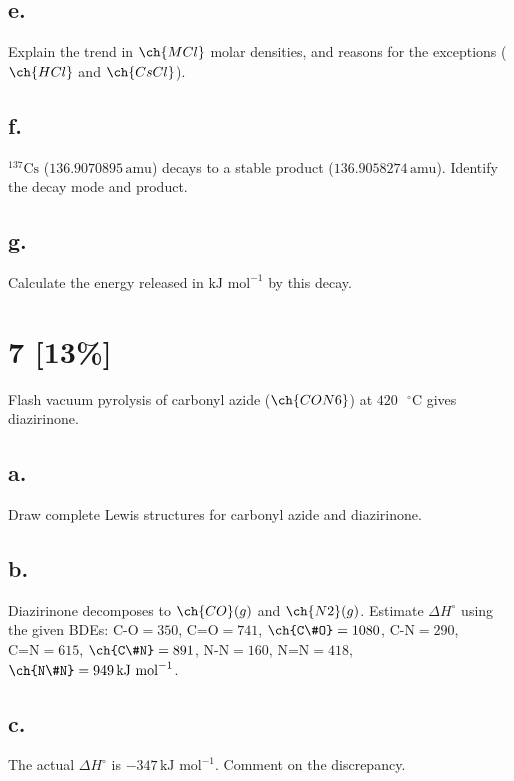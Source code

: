 \documentclass[11pt]{article}
\begin{document}
\subsection*{e.} Explain the trend in $\ch{MCl}$ molar densities, and reasons for the exceptions ($\ch{HCl}$ and $\ch{CsCl}$).
\vspace{3cm}

\subsection*{f.} $^{137}\text{Cs}$ ($136.9070895\,\text{amu}$) decays to a stable product ($136.9058274\,\text{amu}$). Identify the decay mode and product.
\vspace{2cm}

\subsection*{g.} Calculate the energy released in $\text{kJ mol}^{-1}$ by this decay.
\vspace{2cm}

\newpage
\section{7 [13\%]}
Flash vacuum pyrolysis of carbonyl azide ($\ch{CON6}$) at $420\text{ }^{\circ}\text{C}$ gives diazirinone.

\subsection*{a.} Draw complete Lewis structures for carbonyl azide and diazirinone.
\vspace{4cm}

\subsection*{b.} Diazirinone decomposes to $\ch{CO}(g)$ and $\ch{N2}(g)$. Estimate $\Delta H^{\circ}$ using the given BDEs:
$\text{C-O}=350$, $\text{C=O}=741$, $\ch{C\#O}=1080$, $\text{C-N}=290$, $\text{C=N}=615$, $\ch{C\#N}=891$, $\text{N-N}=160$, $\text{N=N}=418$, $\ch{N\#N}=949\,\text{kJ mol}^{-1}$.
\vspace{3cm}

\subsection*{c.} The actual $\Delta H^{\circ}$ is $-347\,\text{kJ mol}^{-1}$. Comment on the discrepancy.
\vspace{2.5cm}
\end{document}

